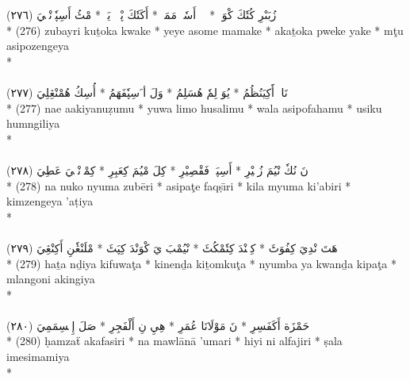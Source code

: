 \documentclass[a4paper, 12pt]{report}
\begin{document}
\begin{center}
\textarabic{(٢٧٦) \textcolor{mygreen}{زُبَىْرِ كُتٗكَ كْوَكٖ  * يٖيٖ أَسٗمٖ مَمَكٖ  * أَكَتٗكَ پْوٖكٖ يَكٖ  * مْٹُ أَسِپٗزٖنْڠٖيَ }} \\* 
(276) zubayri kuṯoka kwake  * yeye asome mamake  * akaṯoka pweke yake  * mţu asipozengeya  \\* 
 \\ 
\\[8mm] 

\textarabic{(٢٧٧) \textcolor{mygreen}{نَاءٖ أََكِيَنُظُمُ  * يُوَ لِمٗ هُسَلِمُ  * وَلَ أ َسِپٗفَهَمُ  * أُسِكُ هُمْنْڠِلِيَ }} \\* 
(277) nae aakiyanuẓumu  * yuwa limo husalimu  * wala  asipofahamu  * usiku humngiliya  \\* 
 \\ 
\\[8mm] 

\textarabic{(٢٧٨) \textcolor{mygreen}{نَ نُكٗ نْيُمَ زُبٖيْرِ  * أَسِپَٹٖ فَقْصِيْرِ  * كِلَ مْيُمَ كِعَبِرِ  * كِمْزٖنْڠٖيَ عَطِيَ }} \\* 
(278) na nuko nyuma zubēri  * asipaţe faqṣı̄ri  * kila myuma ki'abiri  * kimzengeya 'aṭiya  \\* 
 \\ 
\\[8mm] 

\textarabic{(٢٧٩) \textcolor{mygreen}{هَتَ نْدِيَ كِفُوَٹَ  * كِنٖنْدَ كِتٗمْكُٹَ  * نْيُمْبَ يَ كْوَنْدَ كِپَٹَ  * مْلَنْڠٗنِ أَكِنْڠِيَ }} \\* 
(279) haṯa nḏiya kifuwaţa  * kinenḏa kiṯomkuţa  * nyumba ya kwanḏa kipaţa  * mlangoni akingiya  \\* 
 \\ 
\\[8mm] 

\textarabic{(٢٨٠) \textcolor{mygreen}{حَمْزَة أَكَفَسِرِ  * نَ مَوْلَانَا عُمَرِ  * هِيِ نِ أَلْفَجِرِ  * صَلَ إِمٖسِمَمِيَ }} \\* 
(280) ḥamzaẗ akafasiri  * na mawlānā 'umari  * hiyi ni alfajiri  * ṣala imesimamiya  \\* 
 \\ 
\\[8mm] 


\end{center}
\end{document}
